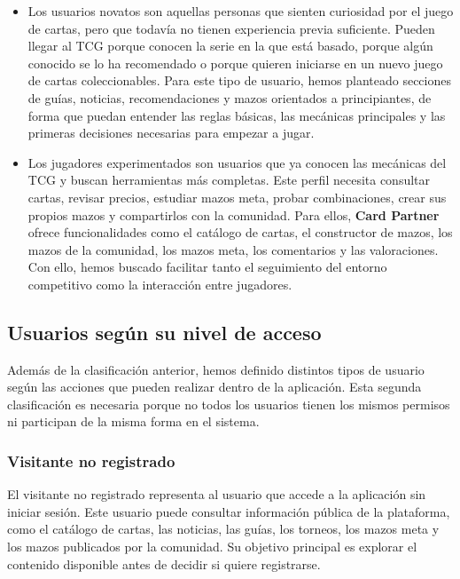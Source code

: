 \documentclass[10pt]{article}
\begin{document}
        \begin{itemize}
            \item Los usuarios novatos son aquellas personas que sienten curiosidad por el juego de cartas, pero que todavía no tienen experiencia previa suficiente. Pueden llegar al TCG porque conocen la serie en la que está basado, porque algún conocido se lo ha recomendado o porque quieren iniciarse en un nuevo juego de cartas coleccionables. Para este tipo de usuario, hemos planteado secciones de guías, noticias, recomendaciones y mazos orientados a principiantes, de forma que puedan entender las reglas básicas, las mecánicas principales y las primeras decisiones necesarias para empezar a jugar.
            \item Los jugadores experimentados son usuarios que ya conocen las mecánicas del TCG y buscan herramientas más completas. Este perfil necesita consultar cartas, revisar precios, estudiar mazos meta, probar combinaciones, crear sus propios mazos y compartirlos con la comunidad. Para ellos, \textbf{Card Partner} ofrece funcionalidades como el catálogo de cartas, el constructor de mazos, los mazos de la comunidad, los mazos meta, los comentarios y las valoraciones. Con ello, hemos buscado facilitar tanto el seguimiento del entorno competitivo como la interacción entre jugadores.
        \end{itemize}

    \subsection{Usuarios según su nivel de acceso}
        Además de la clasificación anterior, hemos definido distintos tipos de usuario según las acciones que pueden realizar dentro de la aplicación. Esta segunda clasificación es necesaria porque no todos los usuarios tienen los mismos permisos ni participan de la misma forma en el sistema.
        
    \subsubsection{Visitante no registrado}
        El visitante no registrado representa al usuario que accede a la aplicación sin iniciar sesión. Este usuario puede consultar información pública de la plataforma, como el catálogo de cartas, las noticias, las guías, los torneos, los mazos meta y los mazos publicados por la comunidad. Su objetivo principal es explorar el contenido disponible antes de decidir si quiere registrarse.\\
        
\end{document}
